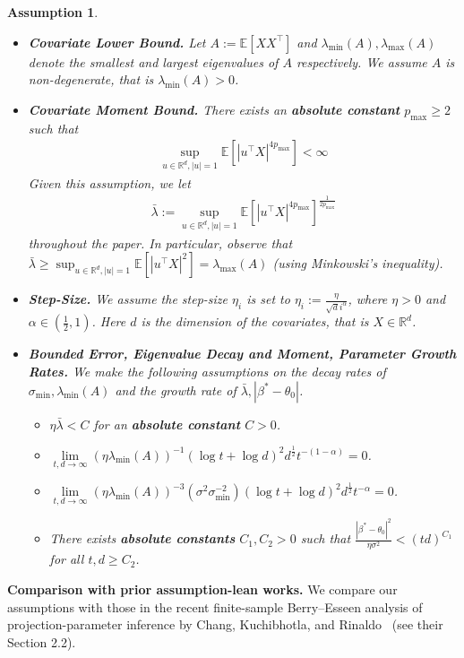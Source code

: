 \documentclass[11pt, reqno,english]{amsart}
\newtheorem{assumption}{Assumption}[section]
\begin{document}
\begin{assumption}
\begin{itemize}[leftmargin=0.3in]
\item[(iii)] \textbf{Covariate Lower Bound.} Let $A := \mathbb{E}[XX^\top]$ and $\lambda_{\min}(A), \lambda_{\max}(A)$ denote the smallest and largest eigenvalues of $A$ respectively. We assume $A$ is non-degenerate, that is $\lambda_{\min} (A) > 0$.  
\item[(iv)] \textbf{Covariate Moment Bound.} There exists an \textbf{absolute constant} $p_{\max} \geq 2$ such that
\begin{align*}
\sup_{u \in \mathbb{R}^d, |u| = 1}\mathbb{E}[|u^\top X|^{4p_{\max}}] < \infty
\end{align*}
Given this assumption, we let 
\begin{align*}
\bar{\lambda} := \sup_{u \in \mathbb{R}^d, |u| = 1} \mathbb{E}[|u^\top X|^{4p_{\max}}]^{\frac{1}{2p_{\max}}}
\end{align*}
throughout the paper. In particular, observe that $\bar{\lambda} \geq \sup_{u \in \mathbb{R}^d, |u| = 1} \mathbb{E}[|u^\top X|^{2}] = \lambda_{\max}(A)$ (using Minkowski's inequality). 
\item[(v)] \textbf{Step-Size.} We assume the step-size $\eta_i$ is set to $\eta_i := \frac{\eta}{\sqrt{d}i^{\alpha}}$, where $\eta > 0$ and $\alpha \in (\frac{1}{2}, 1)$. Here $d$ is the dimension of the covariates, that is $X \in \mathbb{R}^d$.
\item[(vi)] \textbf{Bounded Error, Eigenvalue Decay and Moment, Parameter Growth Rates.} We make the following assumptions on the decay rates of $\sigma_{\min}, \lambda_{\min}(A)$ and the growth rate of $\bar{\lambda}, |\beta^* - \theta_0|$.   
\begin{itemize}
    \item $\eta \bar{\lambda} < C$ for an \textbf{absolute constant} $C > 0$.
    \item $\lim\limits_{t,d \to \infty} (\eta \lambda_{\min}(A))^{-1}(\log t + \log d)^2d^{\frac{1}{2}}t^{-(1 - \alpha)} = 0$. 
    \item $\lim\limits_{t,d \to \infty} (\eta \lambda_{\min}(A))^{-3} (\sigma^2\sigma^{-2}_{\min})(\log t + \log d)^2d^{\frac{1}{2}}t^{-\alpha} = 0$.
    \item There exists \textbf{absolute constants} $C_1, C_2 > 0$ such that $\frac{|\beta^* - \theta_0|^2}{\eta \sigma^2} < (td)^{C_1}$ for all $t, d \geq C_2$. 
\end{itemize}
\end{itemize}
\end{assumption}
\noindent 
\textbf{Comparison with prior assumption-lean works.} 
We compare our assumptions with those in the recent finite-sample Berry--Esseen analysis of projection-parameter inference by Chang, Kuchibhotla, and Rinaldo~\cite{chang2023inference} (see their Section 2.2). 
\end{document}
